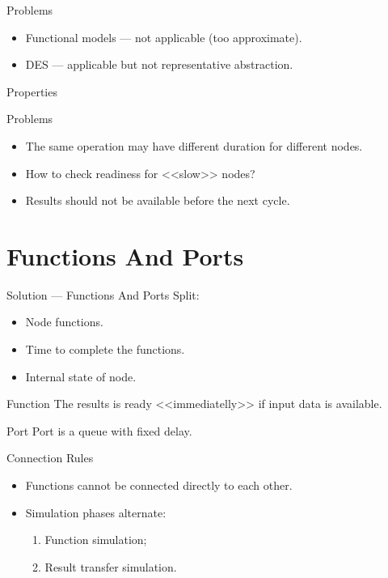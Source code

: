 \begin{frame}{Problems}
\begin{itemize}
\item Functional models --- not applicable (too approximate).
\item DES --- applicable but not representative abstraction.
\end{itemize}
\vfill
\centering
{}
\end{frame}

\begin{frame}{Properties}
\centering
{}
\end{frame}

\begin{frame}{Problems}
\begin{itemize}
\item The same operation may have different duration for different nodes.
\item How to check readiness for <<slow>> nodes?
\item Results should not be available before the next cycle.
\end{itemize}
\end{frame}

\section{Functions And Ports}

\begin{frame}{Solution --- Functions And Ports}
Split:
\begin{itemize}
\item Node functions.
\item Time to complete the functions.
\item Internal state of node.
\end{itemize}
\end{frame}

\begin{frame}{Function}
The results is ready <<immediatelly>> if input data is available.
\vfill
\centering
{}
\end{frame}

\begin{frame}{Port}
Port is a queue with fixed delay.
\vfill
\centering
{}
\end{frame}

\begin{frame}{Connection Rules}
\begin{itemize}
\item Functions cannot be connected directly to each other.
\item Simulation phases alternate:
  \begin{enumerate}
  \item Function simulation;
  \item Result transfer simulation.
  \end{enumerate}
\end{itemize}
\end{frame}

